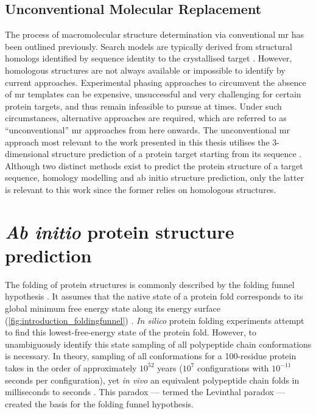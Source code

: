 \subsection{Unconventional Molecular Replacement}
The process of macromolecular structure determination via conventional \gls{mr} has been outlined previously. Search models are typically derived from structural homologs identified by sequence identity to the crystallised target \cite{Rupp2010-nc}. However, homologous structures are not always available or impossible to identify by current approaches. Experimental phasing approaches to circumvent the absence of \gls{mr} templates can be expensive, unsuccessful and very challenging for certain protein targets, and thus remain infeasible to pursue at times. Under such circumstances, alternative approaches are required, which are referred to as ``unconventional'' \gls{mr} approaches from here onwards. The unconventional \gls{mr} approach most relevant to the work presented in this thesis utilises the 3-dimensional structure prediction of a protein target starting from its sequence \cite{Qian2007-vo,Rigden2008-vo,Das2009-uz}. Although two distinct methods exist to predict the protein structure of a target sequence, homology modelling and ab initio structure prediction, only the latter is relevant to this work since the former relies on homologous structures.
 
%
%

\section{\textit{Ab initio} protein structure prediction} \label{sec:introduction_structure_prediction}
The folding of protein structures is commonly described by the folding funnel hypothesis \cite{Leopold1992-yf}. It assumes that the native state of a protein fold corresponds to its global minimum free energy state along its energy surface (\cref{fig:introduction_foldingfunnel}) \cite{Anfinsen1973-in}. \textit{In silico} protein folding experiments attempt to find this lowest-free-energy state of the protein fold. However, to unambiguously identify this state sampling of all polypeptide chain conformations is necessary. In theory, sampling of all conformations for a 100-residue protein takes in the order of approximately $10^{52}$ years ($10^7$ configurations with $10^{-11}$ seconds per configuration), yet \textit{in vivo} an equivalent polypeptide chain folds in milliseconds to seconds \cite{Levinthal1969-bn,Karplus2011-jh}. This paradox --- termed the Levinthal paradox \cite{Levinthal1969-bn} --- created the basis for the folding funnel hypothesis.  

